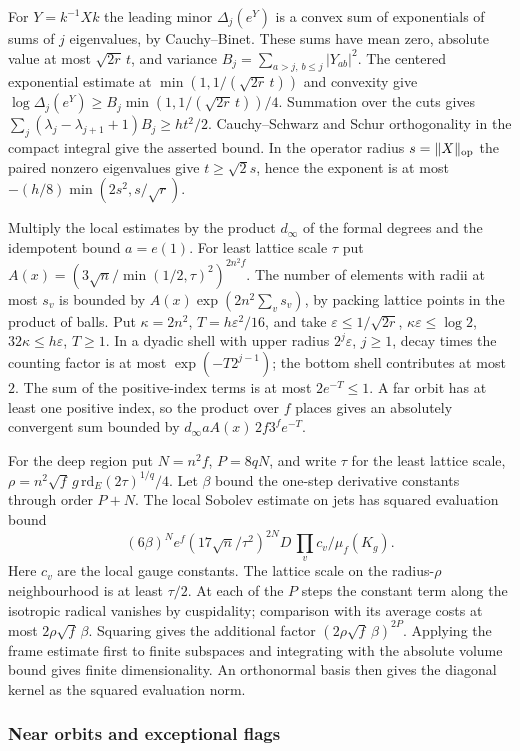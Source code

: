 For $Y=k^{-1}Xk$ the leading minor $\Delta_j(e^Y)$ is a convex sum of exponentials of sums of $j$ eigenvalues, by Cauchy--Binet. These sums have mean zero, absolute value at most $\sqrt{2r}\,t$, and variance $B_j=\sum_{a>j,\,b\le j}|Y_{ab}|^2$. The centered exponential estimate at $\min(1,1/(\sqrt{2r}\,t))$ and convexity give
$\log\Delta_j(e^Y)\ge B_j\min(1,1/(\sqrt{2r}\,t))/4$.
Summation over the cuts gives
$\sum_j(\lambda_j-\lambda_{j+1}+1)B_j\ge ht^2/2$.
Cauchy--Schwarz and Schur orthogonality in the compact integral give the asserted bound. In the operator radius $s=\|X\|_{\rm op}$ the paired nonzero eigenvalues give $t\ge\sqrt2s$, hence the exponent is at most $-(h/8)\min(2s^2,s/\sqrt r)$.

Multiply the local estimates by the product $d_\infty$ of the formal degrees and the idempotent bound $a=e(1)$. For least lattice scale $\tau$ put $A(x)=(3\sqrt n/\min(1/2,\tau)^2)^{2n^2f}$. The number of elements with radii at most $s_v$ is bounded by $A(x)\exp(2n^2\sum_v s_v)$, by packing lattice points in the product of balls. Put $\kappa=2n^2$, $T=h\varepsilon^2/16$, and take $\varepsilon\le1/\sqrt{2r}$, $\kappa\varepsilon\le\log2$, $32\kappa\le h\varepsilon$, $T\ge1$. In a dyadic shell with upper radius $2^j\varepsilon$, $j\ge1$, decay times the counting factor is at most $\exp(-T2^{j-1})$; the bottom shell contributes at most $2$. The sum of the positive-index terms is at most $2e^{-T}\le1$. A far orbit has at least one positive index, so the product over $f$ places gives an absolutely convergent sum bounded by $d_\infty a A(x)\,2f3^fe^{-T}$.

For the deep region put $N=n^2f$, $P=8qN$, and write $\tau$ for the least lattice scale, $\rho=n^2\sqrt f\,g\,\mathrm{rd}_E(2\tau)^{1/q}/4$. Let $\beta$ bound the one-step derivative constants through order $P+N$. The local Sobolev estimate on jets has squared evaluation bound
\[
 (6\beta)^N e^f(17\sqrt n/\tau^2)^{2N}
 D\,\prod_v c_v/\mu_f(K_g).
\]
Here $c_v$ are the local gauge constants. The lattice scale on the radius-$\rho$ neighbourhood is at least $\tau/2$. At each of the $P$ steps the constant term along the isotropic radical vanishes by cuspidality; comparison with its average costs at most $2\rho\sqrt f\,\beta$. Squaring gives the additional factor $(2\rho\sqrt f\,\beta)^{2P}$. Applying the frame estimate first to finite subspaces and integrating with the absolute volume bound gives finite dimensionality. An orthonormal basis then gives the diagonal kernel as the squared evaluation norm.

\subsubsection{Near orbits and exceptional flags}\label{fr:sec:near-orbits}

